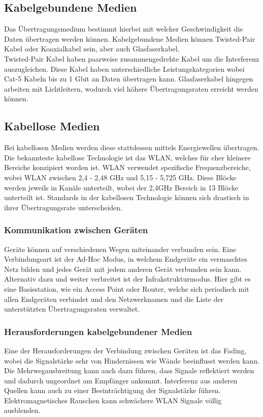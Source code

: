 \documentclass{article}
\begin{document}
	 \subsection{Kabelgebundene Medien}
	 Das Übertragungsmedium bestimmt hierbei mit welcher Geschwindigkeit die Daten übertragen werden können. Kabelgebundene Medien können Twisted-Pair Kabel oder Koaxialkabel sein, aber auch Glasfaserkabel. \\
	 Twisted-Pair Kabel haben paarweise zusammengedrehte Kabel um die Interferenz auszugleichen. Diese Kabel haben unterschiedliche Leistungskategorien wobei Cat-5 Kabeln bis zu 1 Gbit an Daten übertragen kann. Glasfaserkabel hingegen arbeiten mit Lichtleitern, wodurch viel höhere Übertragungsraten erreicht werden können. \\
	 \subsection{Kabellose Medien}
	 Bei kabellosen Medien werden diese stattdessen mittels Energiewellen übertragen. Die bekannteste kabellose Technologie ist das WLAN, welches für eher kleinere Bereiche konzipiert worden ist. WLAN verwendet spezifische Frequenzbereiche, wobei WLAN zwischen 2,4 - 2,48 GHz und 5,15 - 5,725 GHz. Diese Blöcke werden jeweils in Kanäle unterteilt, wobei der 2,4GHz Bereich in 13 Blöcke unterteilt ist. Standards in der kabellosen Technologie können sich drastisch in ihrer Übertragungsrate unterscheiden. \\
	 \subsubsection{Kommunikation zwischen Geräten}
	 Geräte können auf verschiedenen Wegen miteinander verbunden sein. Eine Verbindungsart ist der Ad-Hoc Modus, in welchem Endgeräte ein vermaschtes Netz bilden und jedes Gerät mit jedem anderen Gerät verbunden sein kann. Alternativ dazu und weiter verbreitet ist der Infrakstrukturmodus. Hier gibt es eine Basisstation, wie ein Access Point oder Router, welche sich periodisch mit allen Endgeräten verbindet und den Netzwerknamen und die Liste der unterstützten Übertragungsraten verwaltet.
	 \subsubsection{Herausforderungen kabelgebundener Medien}
	 Eine der Herausforderungen der Verbindung zwischen Geräten ist das Fading, wobei die Signalstärke sehr von Hindernissen wie Wände beeinflusst werden kann. Die Mehrwegausbreitung kann auch dazu führen, dass Signale reflektiert werden und dadurch ungeordnet am Empfänger ankommt. Interferenz aus anderen Quellen kann auch zu einer Beeinträchtigung der Signalstärke führen. Elektromagnetisches Rauschen kann schwächere WLAN Signale völlig ausblenden. \\
\end{document}
